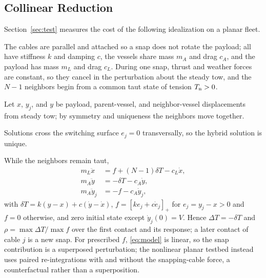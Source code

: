 \subsection{Collinear Reduction}
Section~\ref{sec:test} measures the cost of the following idealization on a planar fleet.
\begin{assumption}\label{ass:collinear}
The cables are parallel and attached so a snap does not rotate the payload; all have stiffness $k$ and damping $c$, the vessels share mass $m_A$ and drag $c_A$, and the payload has mass $m_L$ and drag $c_L$. During one snap, thrust and weather forces are constant, so they cancel in the perturbation about the steady tow, and the $N-1$ neighbors begin from a common taut state of tension $T_{\mathrm{n}}>0$.
\end{assumption}
Let $x$, $y_j$, and $y$ be payload, parent-vessel, and neighbor-vessel displacements from steady tow; by symmetry and uniqueness the neighbors move together.
\begin{assumption}\label{ass:wellposed}
Solutions cross the switching surface $e_j=0$ transversally, so the hybrid solution is unique.
\end{assumption}
While the neighbors remain taut,
\begin{equation}\label{eq:model}
\begin{aligned}
  m_L\ddot x &= f+(N-1)\delta T-c_L\dot x,\\
  m_A\ddot y &= -\delta T-c_A\dot y,\\
  m_A\ddot y_j &= -f-c_A\dot y_j,
\end{aligned}
\end{equation}
with $\delta T=k(y-x)+c(\dot y-\dot x)$, $f=[ke_j+c\dot e_j]_+$ for $e_j=y_j-x>0$ and $f=0$ otherwise, and zero initial state except $\dot y_j(0)=V$. Hence $\Delta T=-\delta T$ and $\rho=\max\Delta T/\max f$ over the first contact and its response; a later contact of cable $j$ is a new snap. For prescribed $f$, \eqref{eq:model} is linear, so the snap contribution is a superposed perturbation; the nonlinear planar testbed instead uses paired re-integrations with and without the snapping-cable force, a counterfactual rather than a superposition.

